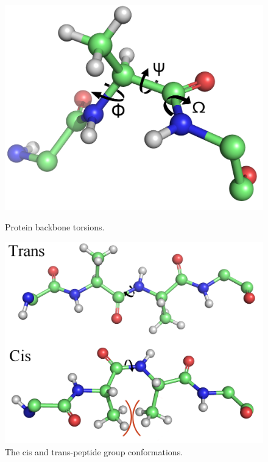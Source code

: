 \begin{figure}[hptb]
\begin{minipage}[b]{0.47\linewidth}
\centering
\includegraphics[width=1.0\textwidth]{01-ProteinStructure/structure/bb_torsion.png}
\caption{Protein backbone torsions.}
\label{fig:intro:bb_torsion}
\end{minipage}
\hspace{0.5cm} %
\begin{minipage}[b]{0.47\linewidth}
\centering
\includegraphics[width=1.0\textwidth]{01-ProteinStructure/structure/cis_trans.png}
\caption{The cis and trans-peptide group conformations.}
\label{fig:intro:cis_trans}
\end{minipage}
\end{figure}

